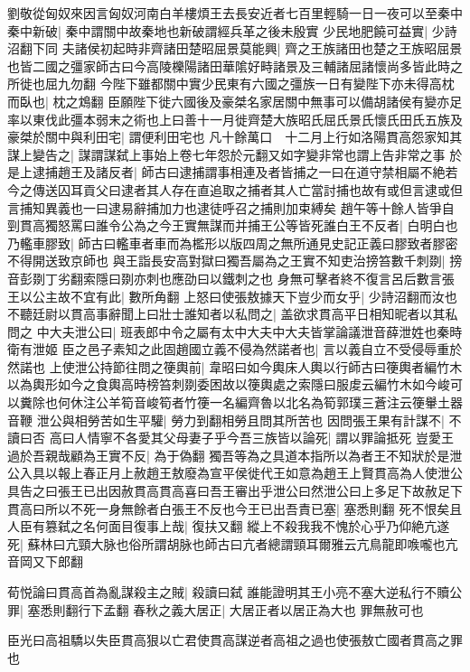 劉敬從匈奴來因言匈奴河南白羊樓煩王去長安近者七百里輕騎一日一夜可以至秦中秦中新破|{
	秦中謂關中故秦地也新破謂經兵革之後未殷實}
少民地肥饒可益實|{
	少詩沼翻下同}
夫諸侯初起時非齊諸田楚昭屈景莫能興|{
	齊之王族諸田也楚之王族昭屈景也皆二國之彊家師古曰今高陵櫟陽諸田華隂好畤諸景及三輔諸屈諸懷尚多皆此時之所徙也屈九勿翻}
今陛下雖都關中實少民東有六國之彊族一日有變陛下亦未得高枕而臥也|{
	枕之鴆翻}
臣願陛下徙六國後及豪桀名家居關中無事可以備胡諸侯有變亦足率以東伐此彊本弱末之術也上曰善十一月徙齊楚大族昭氏屈氏景氏懷氏田氏五族及豪桀於關中與利田宅|{
	謂便利田宅也}
凡十餘萬口　十二月上行如洛陽貫高怨家知其謀上變告之|{
	謀謂謀弑上事始上卷七年怨於元翻又如字變非常也謂上告非常之事}
於是上逮捕趙王及諸反者|{
	師古曰逮捕謂事相連及者皆捕之一曰在道守禁相屬不絶若今之傳送囚耳貢父曰逮者其人存在直追取之捕者其人亡當討捕也故有或但言逮或但言捕知異義也一曰逮易辭捕加力也逮徒呼召之捕則加束縛矣}
趙午等十餘人皆爭自剄貫高獨怒罵曰誰令公為之今王實無謀而并捕王公等皆死誰白王不反者|{
	白明白也}
乃轞車膠致|{
	師古曰轞車者車而為檻形以版四周之無所通見史記正義曰膠致者膠密不得開送致京師也}
與王詣長安高對獄曰獨吾屬為之王實不知吏治搒笞數千刺剟|{
	搒音彭剟丁劣翻索隱曰剟亦刺也應劭曰以鐵刺之也}
身無可擊者終不復言呂后數言張王以公主故不宜有此|{
	數所角翻}
上怒曰使張敖據天下豈少而女乎|{
	少詩沼翻而汝也}
不聽廷尉以貫高事辭聞上曰壯士誰知者以私問之|{
	盖欲求貫高平日相知昵者以其私問之}
中大夫泄公曰|{
	班表郎中令之屬有太中大夫中大夫皆掌論議泄音薛泄姓也秦時衛有泄姬}
臣之邑子素知之此固趙國立義不侵為然諾者也|{
	言以義自立不受侵辱重於然諾也}
上使泄公持節往問之箯輿前|{
	韋昭曰如今輿床人輿以行師古曰箯輿者編竹木以為輿形如今之食輿高時榜笞刺剟委困故以箯輿處之索隱曰服䖍云編竹木如今峻可以糞除也何休注公羊筍音峻筍者竹箯一名編齊魯以北名為筍郭璞三蒼注云箯轝土器音鞭}
泄公與相勞苦如生平驩|{
	勞力到翻相勞且問其所苦也}
因問張王果有計謀不|{
	不讀曰否}
高曰人情寧不各愛其父母妻子乎今吾三族皆以論死|{
	謂以罪論抵死}
豈愛王過於吾親哉顧為王實不反|{
	為于偽翻}
獨吾等為之具道本指所以為者王不知狀於是泄公入具以報上春正月上赦趙王敖廢為宣平侯徙代王如意為趙王上賢貫高為人使泄公具告之曰張王已出因赦貫高貫高喜曰吾王審出乎泄公曰然泄公曰上多足下故赦足下貫高曰所以不死一身無餘者白張王不反也今王已出吾責已塞|{
	塞悉則翻}
死不恨矣且人臣有篡弑之名何面目復事上哉|{
	復扶又翻}
縱上不殺我我不愧於心乎乃仰絶亢遂死|{
	蘇林曰亢頸大脉也俗所謂胡脉也師古曰亢者總謂頸耳爾雅云亢鳥龍即㗋嚨也亢音岡又下郎翻}


荀悦論曰貫高首為亂謀殺主之賊|{
	殺讀曰弑}
誰能證明其王小亮不塞大逆私行不贖公罪|{
	塞悉則翻行下孟翻}
春秋之義大居正|{
	大居正者以居正為大也}
罪無赦可也

臣光曰高祖驕以失臣貫高狠以亡君使貫高謀逆者高祖之過也使張敖亡國者貫高之罪也

